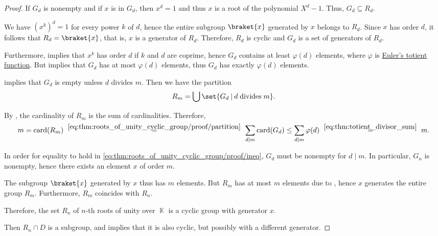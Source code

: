 \begin{proof}
  If \( G_d \) is nonempty and if \( x \) is in \( G_d \), then \( x^d = 1 \) and thus \( x \) is a root of the polynomial \( X^d - 1 \). Thus, \( G_d \subseteq R_d \).

  We have \( (x^k)^d = 1 \) for every power \( k \) of \( d \), hence the entire subgroup \( \braket{ x } \) generated by \( x \) belongs to \( R_d \). Since \( x \) has order \( d \), it follows that \( R_d = \braket{ x } \), that is, \( x \) is a generator of \( R_d \). Therefore, \( R_d \) is cyclic and \( G_d \) is a set of generators of \( R_d \).

  Furthermore,  implies that \( x^k \) has order \( d \) if \( k \) and \( d \) are coprime, hence \( G_d \) contains at least \( \varphi(d) \) elements, where \( \varphi \) is \hyperref[def:eulers_totient_function]{Euler's totient function}. But  implies that \( G_d \) has at most \( \varphi(d) \) elements, thus \( G_d \) has exactly \( \varphi(d) \) elements.

   implies that \( G_d \) is empty unless \( d \) divides \( m \). Then we have the partition
  \begin{equation}\label{eq:thm:roots_of_unity_cyclic_group/proof/partition}
    R_m = \bigcup \set{ G_d \given d \T{divides} m }.
  \end{equation}

  By , the cardinality of \( R_m \) is the sum of cardinalities. Therefore,
  \begin{equation}\label{eq:thm:roots_of_unity_cyclic_group/proof/ineq}
    m
    =
    \card(R_m)
    \reloset {\eqref{eq:thm:roots_of_unity_cyclic_group/proof/partition}} =
    \sum_{d \mid m} \card(G_d)
    \leq
    \sum_{d \mid m} \varphi(d)
    \reloset {\eqref{eq:thm:totient_divisor_sum}} =
    m.
  \end{equation}

  In order for equality to hold in \eqref{eq:thm:roots_of_unity_cyclic_group/proof/ineq}, \( G_d \) must be nonempty for \( d \mid m \). In particular, \( G_n \) is nonempty, hence there exists an element \( x \) of order \( m \).

  The subgroup \( \braket{ x } \) generated by \( x \) thus has \( m \) elements. But \( R_m \) has at most \( m \) elements due to , hence \( x \) generates the entire group \( R_m \). Furthermore, \( R_m \) coincides with \( R_n \).

  Therefore, the set \( R_n \) of \( n \)-th roots of unity over \( \BbbK \) is a cyclic group with generator \( x \).

  Then \( R_n \cap D \) is a subgroup, and  implies that it is also cyclic, but possibly with a different generator.
\end{proof}

